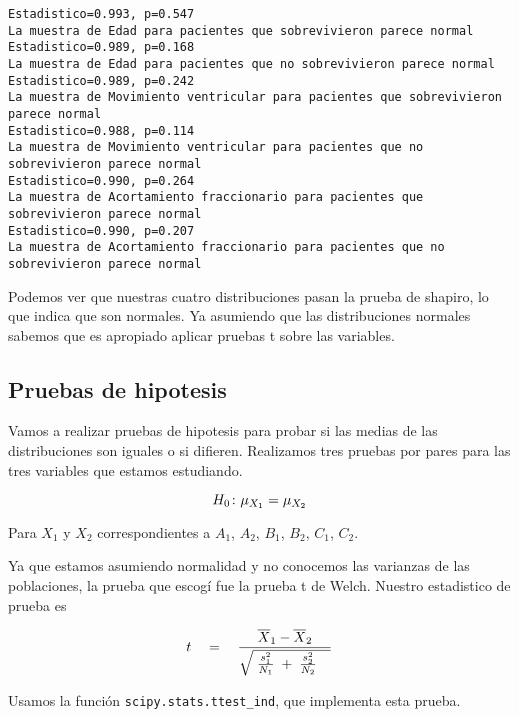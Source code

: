 \documentclass[11pt]{article}
\begin{document}
    \begin{Verbatim}[commandchars=\\\{\}]
Estadistico=0.993, p=0.547
La muestra de Edad para pacientes que sobrevivieron parece normal
Estadistico=0.989, p=0.168
La muestra de Edad para pacientes que no sobrevivieron parece normal
Estadistico=0.989, p=0.242
La muestra de Movimiento ventricular para pacientes que sobrevivieron parece normal
Estadistico=0.988, p=0.114
La muestra de Movimiento ventricular para pacientes que no sobrevivieron parece normal
Estadistico=0.990, p=0.264
La muestra de Acortamiento fraccionario para pacientes que sobrevivieron parece normal
Estadistico=0.990, p=0.207
La muestra de Acortamiento fraccionario para pacientes que no sobrevivieron parece normal

    \end{Verbatim}

    Podemos ver que nuestras cuatro distribuciones pasan la prueba de
shapiro, lo que indica que son normales. Ya asumiendo que las
distribuciones normales sabemos que es apropiado aplicar pruebas t sobre
las variables.

    \hypertarget{pruebas-de-hipotesis}{%
\subsection{Pruebas de hipotesis}\label{pruebas-de-hipotesis}}

Vamos a realizar pruebas de hipotesis para probar si las medias de las
distribuciones son iguales o si difieren. Realizamos tres pruebas por
pares para las tres variables que estamos estudiando.

\[
H_{0}\colon \mu_{X_1} = \mu_{X_2} \\
\]

Para \(X_1\) y \(X_2\) correspondientes a \(A_1\), \(A_2\), \(B_1\),
\(B_2\), \(C_1\), \(C_2\).

Ya que estamos asumiendo normalidad y no conocemos las varianzas de las
poblaciones, la prueba que escogí fue la prueba t de Welch. Nuestro
estadistico de prueba es

\[
t \quad = \quad {\; \overline{X}_1 - \overline{X}_2 \; \over \sqrt{ \; {s_1^2 \over N_1} \; + \; {s_2^2 \over N_2} \quad }}
\]

Usamos la función \texttt{scipy.stats.ttest\_ind}, que implementa esta
prueba.
\end{document}
